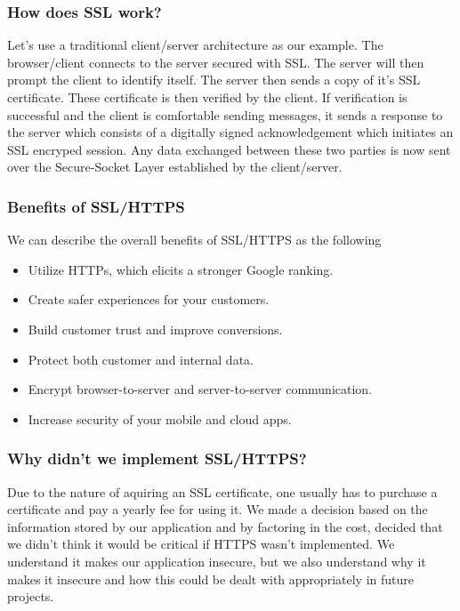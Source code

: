     \subsubsection{How does SSL work?}
    Let's use a traditional client/server architecture as our example. The browser/client connects to the server secured with SSL. The server will then prompt the client to identify itself.
    The server then sends a copy of it's SSL certificate. These certificate is then verified by the client. If verification is successful and the client is comfortable sending messages, it sends a response to the server which consists of a digitally signed acknowledgement which initiates an SSL encryped session.
    Any data exchanged between these two parties is now sent over the Secure-Socket Layer established by the client/server.


    \subsubsection{Benefits of SSL/HTTPS}
    We can describe the overall benefits of SSL/HTTPS as the following

    \begin{itemize}
      \item Utilize HTTPs, which elicits a stronger Google ranking.
      \item Create safer experiences for your customers.
      \item Build customer trust and improve conversions.
      \item Protect both customer and internal data.
      \item Encrypt browser-to-server and server-to-server communication.
      \item Increase security of your mobile and cloud apps.
    \end{itemize}

    \subsubsection{Why didn't we implement SSL/HTTPS?}
    Due to the nature of aquiring an SSL certificate, one usually has to purchase a certificate and pay a yearly fee for using it. We made a decision based on the information stored by our application and by factoring in the cost, decided that we didn't think it would be critical if HTTPS wasn't implemented.
    We understand it makes our application insecure, but we also understand why it makes it insecure and how this could be dealt with appropriately in future projects.


